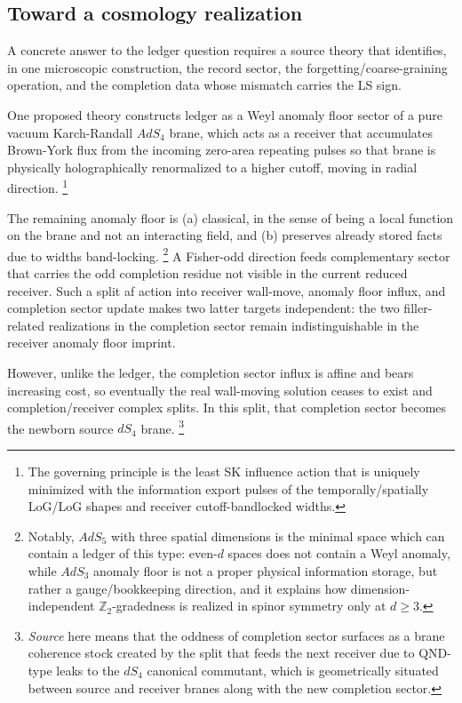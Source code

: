 \documentclass[
  aps,
  prd,
  onecolumn,
  notitlepage,
  nofootinbib,
  superscriptaddress,
  10pt
]{revtex4-2}
\theoremstyle{definition}
\theoremstyle{plain}
\begin{document}
\subsection{Toward a cosmology realization}

A concrete answer to the ledger question requires a source theory that identifies, in one microscopic
construction, the record sector, the forgetting/coarse-graining operation, and the
completion data whose mismatch carries the LS sign.  

One proposed theory constructs ledger as a Weyl anomaly floor sector of a pure vacuum Karch-Randall \(AdS_4\) brane, which acts as a receiver that accumulates Brown-York flux from the incoming zero-area repeating pulses so that brane is physically holographically renormalized to a higher cutoff, moving in radial direction. 
\footnote{The governing principle is the least SK influence action that is uniquely minimized with the information export pulses of the temporally/spatially LoG/LoG shapes and receiver cutoff-bandlocked widths.}

The remaining anomaly floor is (a) classical, in the sense of being a local function on the brane and not an interacting field, and (b) preserves already stored facts due to widths band-locking. \footnote{Notably, \(AdS_5\) with three spatial dimensions is the minimal space which can contain a ledger of this type: even-\(d\) spaces does not contain a Weyl anomaly, while \(AdS_3\) anomaly floor is not a proper physical information storage, but rather a gauge/bookkeeping direction, and it explains how dimension-independent \(\mathbb{Z}_2\)-gradedness is realized in spinor symmetry only at \(d \ge 3\).}
A Fisher-odd direction feeds complementary sector that carries the odd completion residue not visible in the current
reduced receiver. Such a split af action into receiver wall-move, anomaly floor influx, and completion sector update makes two latter targets independent: the two filler-related
realizations in the completion sector remain indistinguishable in the receiver anomaly floor imprint. 

However, unlike the ledger, the completion sector influx is affine and bears increasing cost, so eventually the real wall-moving solution ceases to exist and completion/receiver complex splits.
In this split, that completion sector becomes the newborn source \(dS_4\) brane. \footnote{\emph{Source} here means that the oddness of completion sector surfaces as a brane coherence stock created by the split that feeds the next receiver due to QND-type leaks to the \(dS_4\) canonical commutant, which is geometrically situated between source and receiver branes along with the new completion sector.}
\end{document}
